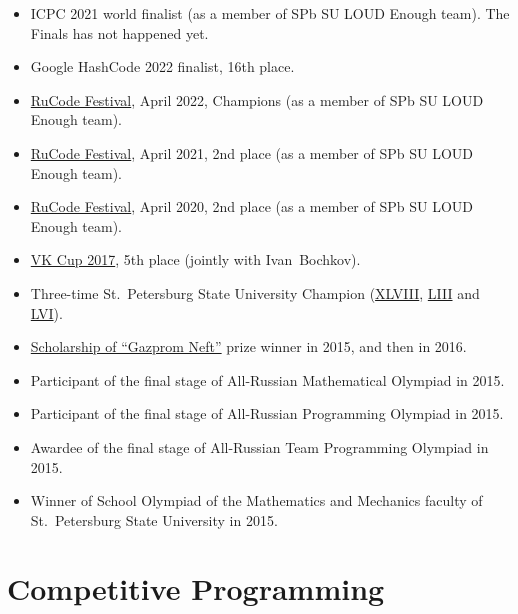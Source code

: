 \documentclass[a4paper, 11pt]{article}
\begin{document}
\begin{itemize}
	\item ICPC 2021 world finalist (as a member of SPb SU LOUD Enough team). The Finals has not happened yet.

	\item Google HashCode 2022 finalist, 16th place.

	\item \href{https://rucode.net/kak-eto-bylo/}{RuCode Festival}, April 2022, Champions (as a member of SPb SU LOUD Enough team).

	\item \href{https://rucode.net/kak-eto-bylo/}{RuCode Festival}, April 2021, 2nd place (as a member of SPb SU LOUD Enough team).

	\item \href{http://rucode.it-edu.mipt.ru/rucode2020resAB}{RuCode Festival}, April 2020, 2nd place (as a member of SPb SU LOUD Enough team).

	\item \href{https://codeforces.com/blog/entry/53192}{VK Cup 2017}, 5th place (jointly with Ivan~Bochkov).

	\item Three-time St.~Petersburg State University Champion (\href{https://acm.math.spbu.ru/cgi-bin/monitor.pl/n171015.dat}{XLVIII}, \href{https://acm.math.spbu.ru/cgi-bin/monitor.pl/n190421.dat}{LIII} and \href{https://acm.math.spbu.ru/cgi-bin/monitor.pl/n201206.dat}{LVI}).

	\item \href{https://math-cs.spbu.ru/en/scholarships-rodnye-goroda/}{Scholarship of ``Gazprom Neft''} prize winner in 2015, and then in 2016.

	\item Participant of the final stage of All-Russian Mathematical Olympiad in 2015.

	\item Participant of the final stage of All-Russian Programming Olympiad in 2015.

	\item Awardee of the final stage of All-Russian Team Programming Olympiad in 2015.

	\item Winner of School Olympiad of the Mathematics and Mechanics faculty of St.~Petersburg State University in 2015.
\end{itemize}

\section*{Competitive Programming}
\end{document}
